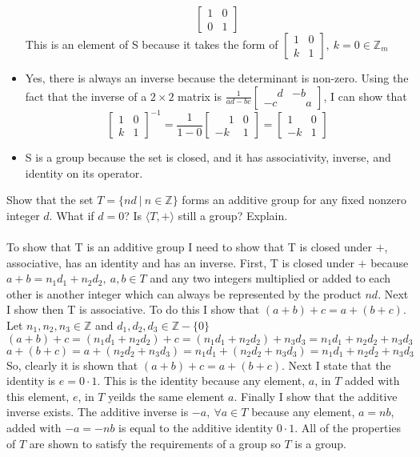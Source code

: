 \documentclass[titlepage]{article}
\newenvironment{problem}[2][Problem]{\begin{trivlist}
\item[\hskip \labelsep {\bfseries #1}\hskip \labelsep {\bfseries #2.}]}{\end{trivlist}}
\begin{document}
\begin{problem}{8}
\begin{itemize}
		$$\begin{bmatrix}
			1 & 0 \\ 0 & 1
		\end{bmatrix}$$
		This is an element of S because it takes the form of $\begin{bmatrix}1&0\\k&1\end{bmatrix}, \ k=0 \in \mathbb{Z}_m$
	\item[(e)] Yes, there is always an inverse because the determinant is non-zero. Using the fact that the inverse of a $2\times 2$ matrix is $\frac{1}{ad-bc}\begin{bmatrix}\phantom{-} d & -b \\ -c & \phantom{-}a  \end{bmatrix}$, I can show that
	$$
	\begin{bmatrix} 1&0 \\ k  & 1 \end{bmatrix}^{-1} = \frac{1}{1-0} \begin{bmatrix} \phantom{-}1 & 0 \\ -k & 1 \end{bmatrix} = \begin{bmatrix} 1&0\\-k&1 \end{bmatrix}
	$$
	\item[(f)] S is a group because the set is closed, and it has associativity, inverse, and identity on its operator.
\end{itemize}
\end{problem}

\begin{problem}{9}
	Show that the set $T = \{nd \ | \ n\in \mathbb{Z}\}$ forms an additive group for any fixed nonzero integer $d$. What if $d=0$? Is $\langle T,+ \rangle$ still a group? Explain.
	\\ \\
	To show that T is an additive group I need to show that T is closed under $+$, associative, has an identity and has an inverse. First, T is closed under $+$ because $a+b = n_1d_1 + n_2d_2, \ a,b \in T$ and any two integers multiplied or added to each other is another integer which can always be represented by the product $nd$. Next I show then T is associative. To do this I show that $(a+b)+c = a+(b+c)$. Let $n_1,n_2,n_3\in \mathbb{Z}$ and $d_1,d_2,d_3\in \mathbb{Z}-\{0\}$
	$$(a+b)+c = (n_1d_1 + n_2d_2) + c = (n_1d_1 + n_2d_2) + n_3d_3 = n_1d_1 + n_2d_2 + n_3d_3 $$
	$$a+(b+c) = a+(n_2d_2 + n_3d_3) = n_1d_1 + (n_2d_2 + n_3d_3) =n_1d_1 + n_2d_2 + n_3d_3$$
	So, clearly it is shown that $(a+b)+c = a+(b+c)$.
	Next I state that the identity is $e= 0\cdot 1$. This is the identity because any element, $a$, in $T$ added with this element, $e$, in $T$ yeilds the same element $a$. Finally I show that the additive inverse exists. The additive inverse is $-a , \ \forall a\in T$ because any element, $a=nb$, added with $-a = -nb$ is equal to the additive identity $0\cdot1$. All of the properties of $T$ are shown to satisfy the requirements of a group so $T$ is a group.
\end{problem}
\end{document}
